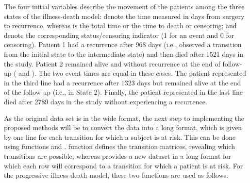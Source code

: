 The four initial variables describe the movement of the patients among the three states of the illness-death model:  denote the time measured in days from surgery to recurrence, whereas  is the total time or the time to death or censoring;  and  denote the corresponding status/censoring indicator (1 for an event and 0 for censoring). Patient 1 had a recurrence after 968 days (i.e., observed a transition from the initial state to the intermediate state) and then died after 1521 days in the study. Patient 2 remained alive and without recurrence at the end of follow-up ( and ). The two event times are equal in these cases. The patient represented in the third line had a recurrence after 1323 days but remained alive at the end of the follow-up (i.e., in State 2). Finally, the patient represented in the last line died after 2789 days in the study without experiencing a recurrence. 


As the original data set is in the wide format, the next step to implementing the proposed methods will be to convert the data into a long format, which is given by one line for each transition for which a subject is at risk. This can be done using functions  and .  function defines the transition matrices, revealing which transitions are possible, whereas  provides a new dataset in a long format for which each row will correspond to a transition for which a patient is at risk. For the progressive illness-death model, these two functions are used as follows:

